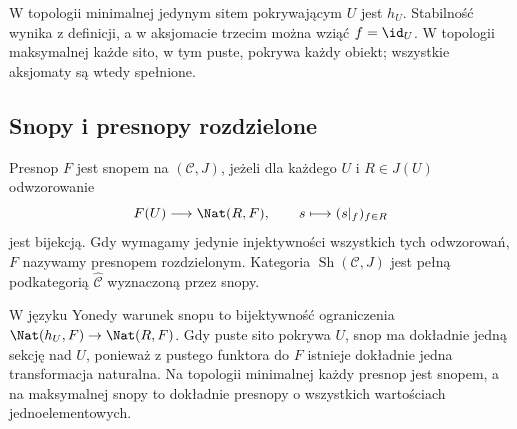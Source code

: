 \begin{przyklad}\label{cat:ex:extreme-topologies}
W topologii minimalnej jedynym sitem pokrywającym $U$ jest $h_U$. Stabilność wynika z definicji, a w aksjomacie trzecim można wziąć $f=\id_U$. W topologii maksymalnej każde sito, w tym puste, pokrywa każdy obiekt; wszystkie aksjomaty są wtedy spełnione.
\end{przyklad}

\subsection{Snopy i presnopy rozdzielone}

\begin{definicja}\label{cat:def:site-sheaf}
Presnop $F$ jest snopem na $(\mathcal C,J)$, jeżeli dla każdego $U$ i $R\in J(U)$ odwzorowanie
\begin{equation}\label{cat:eq:sheaf-condition}
 F(U)\longrightarrow\Nat(R,F),\qquad s\longmapsto (s|_f)_{f\in R}
\end{equation}
jest bijekcją. Gdy wymagamy jedynie injektywności wszystkich tych odwzorowań, $F$ nazywamy presnopem rozdzielonym. Kategoria $\operatorname{Sh}(\mathcal C,J)$ jest pełną podkategorią $\widehat{\mathcal C}$ wyznaczoną przez snopy.
\end{definicja}

W języku Yonedy warunek snopu to bijektywność ograniczenia $\Nat(h_U,F)\to\Nat(R,F)$. Gdy puste sito pokrywa $U$, snop ma dokładnie jedną sekcję nad $U$, ponieważ z pustego funktora do $F$ istnieje dokładnie jedna transformacja naturalna. Na topologii minimalnej każdy presnop jest snopem, a na maksymalnej snopy to dokładnie presnopy o wszystkich wartościach jednoelementowych.

